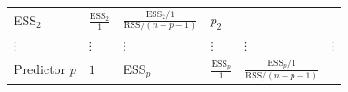 \documentclass[]{book}
\theoremstyle{definition}
\theoremstyle{definition}
\theoremstyle{definition}
\theoremstyle{remark}
\begin{document}
\begin{longtable}[]{@{}llllll@{}}
\begin{minipage}[t]{0.10\columnwidth}
ESS\(_2\)\strut
\end{minipage} & \begin{minipage}[t]{0.11\columnwidth}\raggedright\strut
\(\frac{\text{ESS}_2}{1}\)\strut
\end{minipage} & \begin{minipage}[t]{0.18\columnwidth}\raggedright\strut
\(\frac{\text{ESS}_2/1}{\text{RSS}/(n-p-1)}\)\strut
\end{minipage} & \begin{minipage}[t]{0.15\columnwidth}\raggedright\strut
\(p_2\)\strut
\end{minipage}\tabularnewline
\begin{minipage}[t]{0.16\columnwidth}\raggedright\strut
\(\vdots\)\strut
\end{minipage} & \begin{minipage}[t]{0.14\columnwidth}\raggedright\strut
\(\vdots\)\strut
\end{minipage} & \begin{minipage}[t]{0.10\columnwidth}\raggedright\strut
\(\vdots\)\strut
\end{minipage} & \begin{minipage}[t]{0.11\columnwidth}\raggedright\strut
\(\vdots\)\strut
\end{minipage} & \begin{minipage}[t]{0.18\columnwidth}\raggedright\strut
\(\vdots\)\strut
\end{minipage} & \begin{minipage}[t]{0.15\columnwidth}\raggedright\strut
\(\vdots\)\strut
\end{minipage}\tabularnewline
\begin{minipage}[t]{0.16\columnwidth}\raggedright\strut
Predictor \(p\)\strut
\end{minipage} & \begin{minipage}[t]{0.14\columnwidth}\raggedright\strut
\(1\)\strut
\end{minipage} & \begin{minipage}[t]{0.10\columnwidth}\raggedright\strut
ESS\(_p\)\strut
\end{minipage} & \begin{minipage}[t]{0.11\columnwidth}\raggedright\strut
\(\frac{\text{ESS}_p}{1}\)\strut
\end{minipage} & \begin{minipage}[t]{0.18\columnwidth}\raggedright\strut
\(\frac{\text{ESS}_p/1}{\text{RSS}/(n-p-1)}\)\strut
\end{minipage} & \begin{minipage}[t]{0.15\columnwidth}\raggedright\strut

\end{minipage}
\end{longtable}
\end{document}

